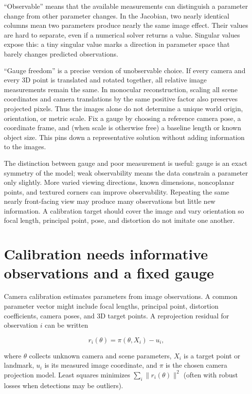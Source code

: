 ``Observable'' means that the available measurements can distinguish a parameter change from other parameter changes. In the Jacobian, two nearly identical columns mean two parameters produce nearly the same image effect. Their values are hard to separate, even if a numerical solver returns a value. Singular values expose this: a tiny singular value marks a direction in parameter space that barely changes predicted observations.

``Gauge freedom'' is a precise version of unobservable choice. If every camera and every 3D point is translated and rotated together, all relative image measurements remain the same. In monocular reconstruction, scaling all scene coordinates and camera translations by the same positive factor also preserves projected pixels. Thus the images alone do not determine a unique world origin, orientation, or metric scale. Fix a gauge by choosing a reference camera pose, a coordinate frame, and (when scale is otherwise free) a baseline length or known object size. This pins down a representative solution without adding information to the images.

The distinction between gauge and poor measurement is useful: gauge is an exact symmetry of the model; weak observability means the data constrain a parameter only slightly. More varied viewing directions, known dimensions, noncoplanar points, and textured corners can improve observability. Repeating the same nearly front-facing view may produce many observations but little new information. A calibration target should cover the image and vary orientation so focal length, principal point, pose, and distortion do not imitate one another.

\section{Calibration needs informative observations and a fixed gauge}\label{02-foundations-ii-ch036-calibration-needs-informative-observations-and-a-fixed-gauge}

Camera calibration estimates parameters from image observations. A common parameter vector might include focal lengths, principal point, distortion coefficients, camera poses, and 3D target points. A reprojection residual for observation \(i\) can be written

\[
r_i(\theta)=\pi(\theta, X_i)-u_i,
\]

where \(\theta\) collects unknown camera and scene parameters, \(X_i\) is a target point or landmark, \(u_i\) is its measured image coordinate, and \(\pi\) is the chosen camera projection model. Least squares minimizes \(\sum_i \|r_i(\theta)\|^2\) (often with robust losses when detections may be outliers).

